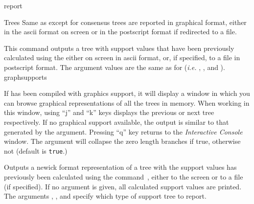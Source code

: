 \begin{command}{report}{}
\begin{arguments}
\begin{argumentgroup}{Trees}
                {Same as  except for consensus trees are
                reported in graphical format, either in the ascii format on
                screen or in the postscript format if redirected to a file.}
                {}

                {This command outputs a tree with support values that have
                been previously calculated using the
                 either on screen
                in ascii format, or, if specified, to a file in postscript
                format. The argument values are the same as for 
                 (\emph{i.e.} ,
                , and ).} 
                {graphsupports}

                {If \poy has been compiled with graphics support, it 
                will display a window in which you can
                browse graphical representations of all the trees in memory.
                When working in this window, using ``j'' and ``k'' keys displays the
                previous or next tree respectively. If no graphical support available, the output 
                is similar to that generated by the  argument. Pressing ``q'' key 
                returns to the \emph{Interactive Console} window. The argument
                 will collapse the zero length branches if
                true, otherwise not (default is \texttt{true}.)} 
	     {}

                {Outputs a newick format representation of a tree with the
                support values has previously been calculated using the
                command~,
                either to the screen or to a file (if specified). If no argument
                is given, all calculated support values are printed. The arguments
                , , and
                 specify which type of support tree to
                report. 
                
}
\end{argumentgroup}
\end{arguments}
\end{command}
